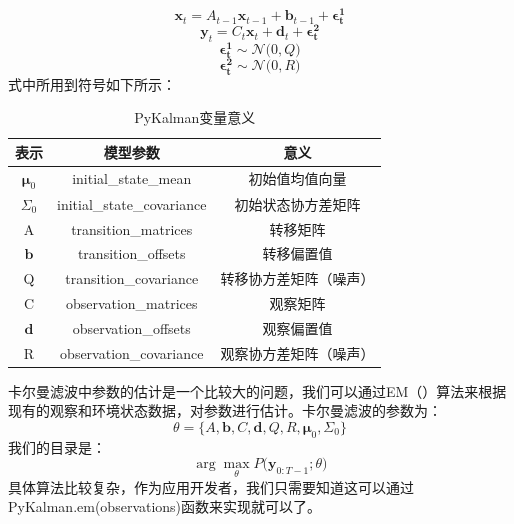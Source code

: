 \begin{equation}
\boldsymbol{x}_{t} = A_{t-1}\boldsymbol{x}_{t-1} + \boldsymbol{b}_{t-1} + \boldsymbol{\epsilon _{t}^{1}}
\label{e000071}
\end{equation}
\begin{equation}
\boldsymbol{y}_{t} = C_{t}\boldsymbol{x}_{t} + \boldsymbol{d}_{t} + \boldsymbol{\epsilon _{t}^{2}}
\label{e000072}
\end{equation}
\begin{equation}
\boldsymbol{\epsilon _{t}^{1}} \sim \mathcal{N} \big( 0, Q \big)
\label{e000073}
\end{equation}
\begin{equation}
\boldsymbol{\epsilon _{t}^{2}} \sim \mathcal{N} \big( 0, R \big)
\label{e000074}
\end{equation}
式中所用到符号如下所示：
\begin{table}[h]
\caption{PyKalman变量意义}
\label{t000002}
\begin{tabular}{|c|c|c|} \hline
表示 & 模型参数 & 意义 \\ \hline  
$\boldsymbol{\mu} _ {0}$ & initial\_state\_mean & 初始值均值向量 \\ \hline
$\Sigma _{0}$ & initial\_state\_covariance & 初始状态协方差矩阵 \\ \hline
A & transition\_matrices & 转移矩阵 \\ \hline
$\boldsymbol{b}$ & transition\_offsets &  转移偏置值 \\ \hline
Q & transition\_covariance & 转移协方差矩阵（噪声） \\ \hline
C & observation\_matrices & 观察矩阵 \\ \hline
$\boldsymbol{d}$ & observation\_offsets & 观察偏置值 \\ \hline
R & observation\_covariance & 观察协方差矩阵（噪声） \\ \hline
\end{tabular}
\end{table}
卡尔曼滤波中参数的估计是一个比较大的问题，我们可以通过EM（）算法来根据现有的观察和环境状态数据，对参数进行估计。卡尔曼滤波的参数为：
\begin{equation}
\theta = \{A, \boldsymbol{b}, C, \boldsymbol{d}, Q, R, \boldsymbol{\mu}_{0}, \Sigma _{0}\}
\label{e000075}
\end{equation}
我们的目录是：
\begin{equation}
\arg \max _{\theta} P \big( \boldsymbol{y}_{0:T-1};\theta \big)
\label{e000076}
\end{equation}
具体算法比较复杂，作为应用开发者，我们只需要知道这可以通过PyKalman.em(observations)函数来实现就可以了。\newline
